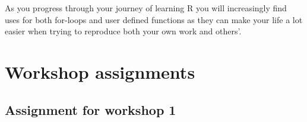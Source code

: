 \documentclass[
]{book}
\begin{document}
As you progress through your journey of learning R you will increasingly find uses for both for-loops and user defined functions as they can make your life a lot easier when trying to reproduce both your own work and others'.

\hypertarget{part-workshop-assignments}{%
\part{Workshop assignments}\label{part-workshop-assignments}}

\hypertarget{assignment-for-workshop-1}{%
\chapter*{Assignment for workshop 1}\label{assignment-for-workshop-1}}
\end{document}
